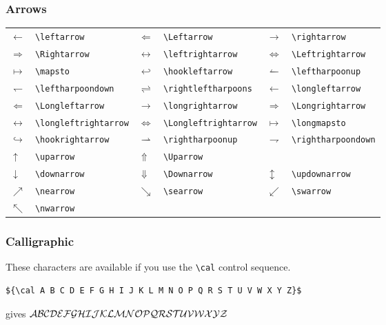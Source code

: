 \documentclass[dvips]{article}
\begin{document}
\subsubsection{Arrows}
\begin{longtable}{llllll}
$\leftarrow$&      \verb|\leftarrow|&
$\Leftarrow$&       \verb|\Leftarrow|&          
$\rightarrow$&      \verb|\rightarrow|\\          
$\Rightarrow$&      \verb|\Rightarrow|&          
$\leftrightarrow$& \verb|\leftrightarrow|&     
$\Leftrightarrow$&  \verb|\Leftrightarrow|\\      
$\mapsto$&          \verb|\mapsto|&              
$\hookleftarrow$&   \verb|\hookleftarrow|&      
$\leftharpoonup$&  \verb|\leftharpoonup|\\     
$\leftharpoondown$& \verb|\leftharpoondown|&     
$\rightleftharpoons$& \verb|\rightleftharpoons|& 
$\longleftarrow$&   \verb|\longleftarrow|\\  
$\Longleftarrow$&  \verb|\Longleftarrow|&      
$\longrightarrow$&  \verb|\longrightarrow|&      
$\Longrightarrow$&  \verb|\Longrightarrow|\\      
$\longleftrightarrow$& \verb|\longleftrightarrow|&
$\Longleftrightarrow$& \verb|\Longleftrightarrow|&
$\longmapsto$&      \verb|\longmapsto|\\          
$\hookrightarrow$&  \verb|\hookrightarrow|&      
$\rightharpoonup$&  \verb|\rightharpoonup|&     
$\rightharpoondown$& \verb|\rightharpoondown|\\ 
$\uparrow$&         \verb|\uparrow|&             
$\Uparrow$&         \verb|\Uparrow|\\             
$\downarrow$&      \verb|\downarrow|&          
$\Downarrow$&       \verb|\Downarrow|&           
$\updownarrow$&     \verb|\updownarrow|\\         
$\nearrow$&         \verb|\nearrow|&        
$\searrow$&        \verb|\searrow|&            
$\swarrow$&         \verb|\swarrow|\\             
$\nwarrow$&         \verb|\nwarrow|&  & & & \\
\end{longtable}            


\subsubsection{Calligraphic}
These characters are available if you use the \verb|\cal| control
sequence.
\begin{verbatim} 
${\cal A B C D E F G H I J K L M N O P Q R S T U V W X Y Z}$
\end{verbatim}
gives
${\cal A B C D E F G H I J K L M N O P Q R S T U V W X Y Z}$
\end{document}
